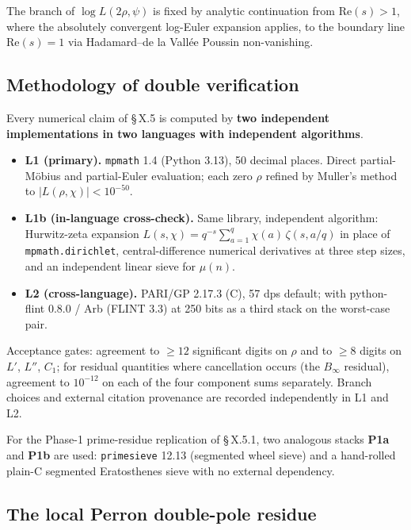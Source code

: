 The branch of \(\log L(2\rho,\psi)\) is fixed by analytic continuation
from \(\mathrm{Re}(s) > 1\), where the absolutely convergent log-Euler
expansion applies, to the boundary line \(\mathrm{Re}(s) = 1\) via
Hadamard--de la Vallée Poussin non-vanishing.

\subsection{Methodology of double verification}

Every numerical claim of \S\,X.5 is computed by \textbf{two independent
implementations in two languages with independent algorithms}.

\begin{itemize}
\item
  \textbf{L1 (primary).} \texttt{mpmath} 1.4 (Python 3.13), 50 decimal places.
  Direct partial-Möbius and partial-Euler evaluation; each zero \(\rho\)
  refined by Muller's method to \(|L(\rho,\chi)| < 10^{-50}\).
\item
  \textbf{L1b (in-language cross-check).} Same library, independent
  algorithm: Hurwitz-zeta expansion
  \(L(s,\chi) = q^{-s}\sum_{a=1}^{q}\chi(a)\,\zeta(s, a/q)\) in place
  of \texttt{mpmath.dirichlet}, central-difference numerical derivatives at
  three step sizes, and an independent linear sieve for \(\mu(n)\).
\item
  \textbf{L2 (cross-language).} PARI/GP 2.17.3 (C), 57 dps default; with
  python-flint 0.8.0 / Arb (FLINT 3.3) at 250 bits as a third stack
  on the worst-case pair.
\end{itemize}

Acceptance gates: agreement to \(\ge 12\) significant digits on \(\rho\)
and to \(\ge 8\) digits on \(L'\), \(L''\), \(C_1\); for residual quantities
where cancellation occurs (the \(B_\infty\) residual), agreement to
\(10^{-12}\) on each of the four component sums separately. Branch
choices and external citation provenance are recorded independently
in L1 and L2.

For the Phase-1 prime-residue replication of \S\,X.5.1, two analogous
stacks \textbf{P1a} and \textbf{P1b} are used: \texttt{primesieve} 12.13 (segmented
wheel sieve) and a hand-rolled plain-C segmented Eratosthenes sieve
with no external dependency.

\subsection{The local Perron double-pole residue}

